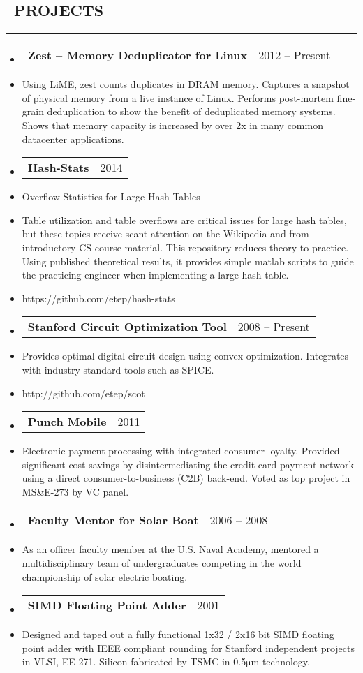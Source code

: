 \documentclass[10pt,letterpaper]{article}
\makeatletter
\newenvironment{resumesection}[1]
{%
    \subsection*{\ \textcolor{light-gray}{#1} }
    \vspace{-0.4em}
    \begin{samepage}
    \hrule
    \end{samepage}
    \vspace{+0.4em}
    \begin{itemize}[leftmargin=0.15cm]
        \parskip=0.1em
}%
{%
    \end{itemize}
}%
\newcommand{\myitem}[1] {
    \item[] \textcolor{dark-gray}{#1}
}
\newcommand{\headerbi}[2] {
    \item[] \begin{tabular*}{\linewidth}{l@{\extracolsep{\fill}}r}
    \textbf{#1} & #2 \\
    \end{tabular*}
}
\newcommand{\rminiw}{0.550}
\makeatother
\begin{document}
\begin{minipage}[t]{\rminiw\textwidth}
\begin{resumesection}{PROJECTS}
    \headerbi{Zest -- Memory Deduplicator for Linux}{2012 -- Present}
    \myitem{Using LiME, zest counts duplicates in DRAM memory.
            Captures a snapshot of physical memory from a live instance of Linux.
            Performs post-mortem fine-grain deduplication to show the benefit of deduplicated memory systems.
            Shows that memory capacity is increased by over 2x in many common datacenter applications.}
    \headerbi{Hash-Stats}{2014}
    \myitem{Overflow Statistics for Large Hash Tables}
    \myitem{Table utilization and table overflows are critical issues for large hash tables,
            but these topics receive scant attention on the Wikipedia and from introductory CS course material.
            This repository reduces theory to practice.
            Using published theoretical results, it provides simple matlab scripts to guide the practicing engineer when implementing a large hash table.}
    \myitem{https://github.com/etep/hash-stats}
    \headerbi{Stanford Circuit Optimization Tool}{2008 -- Present}
    \myitem{Provides optimal digital circuit design using convex optimization.
            Integrates with industry standard tools such as SPICE.}
    \myitem{http://github.com/etep/scot}
    \headerbi{Punch Mobile}{2011}
    \myitem{Electronic payment processing with integrated consumer loyalty.
            Provided significant cost savings by disintermediating the credit card payment network using a direct consumer-to-business (C2B) back-end.
            Voted as top project in MS\&E-273 by VC panel.}
    \headerbi{Faculty Mentor for Solar Boat}{2006 -- 2008}
    \myitem{As an officer faculty member at the U.S. Naval Academy,
            mentored a multidisciplinary team of undergraduates
            competing in the world championship of solar electric boating.}
    \headerbi{SIMD Floating Point Adder}{2001}
    \myitem{Designed and taped out a fully functional 1x32 / 2x16 bit
            SIMD floating point adder with IEEE compliant rounding
            for Stanford independent projects in VLSI, EE-271.
            Silicon fabricated by TSMC in 0.5$\mathrm{ \mu m}$ technology.}
\end{resumesection}
\end{minipage}
\end{document}
